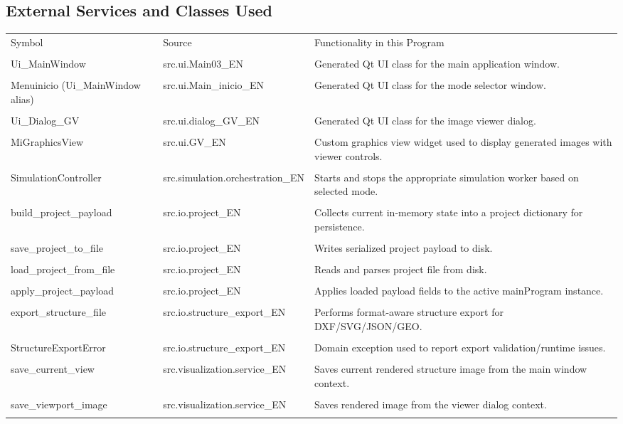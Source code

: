﻿\documentclass[11pt,a4paper]{article}
\begin{document}
\subsection*{External Services and Classes Used}

\begin{longtable}{|p{}|p{}|p{}|}
\hline
Symbol & Source & Functionality in this Program \\\\
\hline
Ui\_MainWindow & src.ui.Main03\_EN & Generated Qt UI class for the main application window. \\\\
\hline
Menuinicio (Ui\_MainWindow alias) & src.ui.Main\_inicio\_EN & Generated Qt UI class for the mode selector window. \\\\
\hline
Ui\_Dialog\_GV & src.ui.dialog\_GV\_EN & Generated Qt UI class for the image viewer dialog. \\\\
\hline
MiGraphicsView & src.ui.GV\_EN & Custom graphics view widget used to display generated images with viewer controls. \\\\
\hline
SimulationController & src.simulation.orchestration\_EN & Starts and stops the appropriate simulation worker based on selected mode. \\\\
\hline
build\_project\_payload & src.io.project\_EN & Collects current in-memory state into a project dictionary for persistence. \\\\
\hline
save\_project\_to\_file & src.io.project\_EN & Writes serialized project payload to disk. \\\\
\hline
load\_project\_from\_file & src.io.project\_EN & Reads and parses project file from disk. \\\\
\hline
apply\_project\_payload & src.io.project\_EN & Applies loaded payload fields to the active mainProgram instance. \\\\
\hline
export\_structure\_file & src.io.structure\_export\_EN & Performs format-aware structure export for DXF/SVG/JSON/GEO. \\\\
\hline
StructureExportError & src.io.structure\_export\_EN & Domain exception used to report export validation/runtime issues. \\\\
\hline
save\_current\_view & src.visualization.service\_EN & Saves current rendered structure image from the main window context. \\\\
\hline
save\_viewport\_image & src.visualization.service\_EN & Saves rendered image from the viewer dialog context. \\\\
\hline
\end{longtable}
\end{document}
